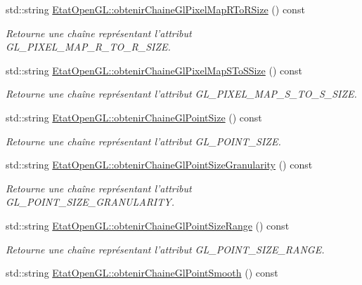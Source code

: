 \begin{DoxyCompactItemize}
std\-::string \hyperlink{group__utilitaire_ga315fd9fa34e26c259ce76e33ddadc11b}{Etat\-Open\-G\-L\-::obtenir\-Chaine\-Gl\-Pixel\-Map\-R\-To\-R\-Size} () const 
\begin{DoxyCompactList}\small\item\em Retourne une chaîne représentant l'attribut G\-L\-\_\-\-P\-I\-X\-E\-L\-\_\-\-M\-A\-P\-\_\-\-R\-\_\-\-T\-O\-\_\-\-R\-\_\-\-S\-I\-Z\-E. \end{DoxyCompactList}\item 
std\-::string \hyperlink{group__utilitaire_ga5d77ae2d820ab8304af841033ee957ef}{Etat\-Open\-G\-L\-::obtenir\-Chaine\-Gl\-Pixel\-Map\-S\-To\-S\-Size} () const 
\begin{DoxyCompactList}\small\item\em Retourne une chaîne représentant l'attribut G\-L\-\_\-\-P\-I\-X\-E\-L\-\_\-\-M\-A\-P\-\_\-\-S\-\_\-\-T\-O\-\_\-\-S\-\_\-\-S\-I\-Z\-E. \end{DoxyCompactList}\item 
std\-::string \hyperlink{group__utilitaire_gad02efc6cfc989e454b9cc91443fef303}{Etat\-Open\-G\-L\-::obtenir\-Chaine\-Gl\-Point\-Size} () const 
\begin{DoxyCompactList}\small\item\em Retourne une chaîne représentant l'attribut G\-L\-\_\-\-P\-O\-I\-N\-T\-\_\-\-S\-I\-Z\-E. \end{DoxyCompactList}\item 
std\-::string \hyperlink{group__utilitaire_ga77ea6a1da567197d644dcd11743f67a8}{Etat\-Open\-G\-L\-::obtenir\-Chaine\-Gl\-Point\-Size\-Granularity} () const 
\begin{DoxyCompactList}\small\item\em Retourne une chaîne représentant l'attribut G\-L\-\_\-\-P\-O\-I\-N\-T\-\_\-\-S\-I\-Z\-E\-\_\-\-G\-R\-A\-N\-U\-L\-A\-R\-I\-T\-Y. \end{DoxyCompactList}\item 
std\-::string \hyperlink{group__utilitaire_gab2553c47e6d7fa315b61ab5dcdb1506e}{Etat\-Open\-G\-L\-::obtenir\-Chaine\-Gl\-Point\-Size\-Range} () const 
\begin{DoxyCompactList}\small\item\em Retourne une chaîne représentant l'attribut G\-L\-\_\-\-P\-O\-I\-N\-T\-\_\-\-S\-I\-Z\-E\-\_\-\-R\-A\-N\-G\-E. \end{DoxyCompactList}\item 
std\-::string \hyperlink{group__utilitaire_ga32e178d5d54d00dc20f27cf516943a65}{Etat\-Open\-G\-L\-::obtenir\-Chaine\-Gl\-Point\-Smooth} () const 

\end{DoxyCompactItemize}
